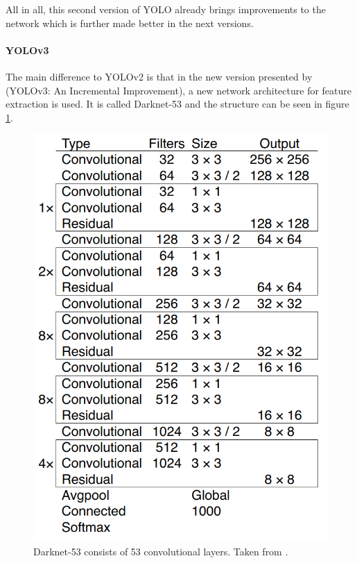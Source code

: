 All in all, this second version of YOLO already brings improvements to the network which is further made better in the next versions.


\paragraph{YOLOv3}
The main difference to YOLOv2 is that in the new version presented by \cite{yolov3} (YOLOv3: An Incremental Improvement), a new network architecture for feature extraction is used. It is called Darknet-53 and the structure can be seen in figure \ref{fig:yolov3_architecture}.\\

\begin{figure}[htb!]
	\centering
	\includegraphics[scale=0.28]{figures/yolov3_architecture.png}
	\caption{Darknet-53 consists of 53 convolutional layers. Taken from \cite{yolov3}.}
	\label{fig:yolov3_architecture}
\end{figure}

